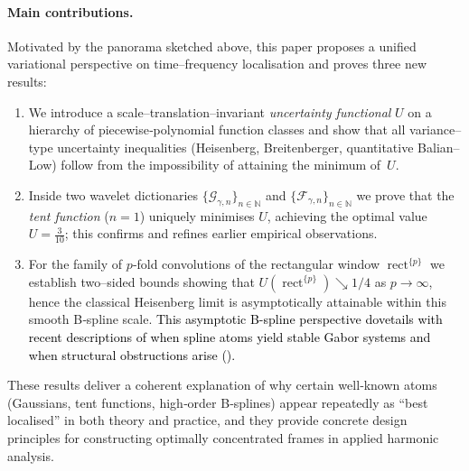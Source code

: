 \documentclass[preprint,hidelinks,authoryear]{elsarticle}
\theoremstyle{plain}
\theoremstyle{definition}
\theoremstyle{remark}
\begin{document}
\paragraph*{Main contributions.}
Motivated by the panorama sketched above, this paper proposes a unified
variational perspective on time–frequency localisation and proves three
new results:

\begin{enumerate}[label=\textbf{C\arabic*}.]
  \item We introduce a scale–translation–invariant \emph{uncertainty
        functional} $U$ on a hierarchy of piece\-wise‑polynomial
        function classes and show that all variance–type uncertainty
        inequalities (Heisenberg, Breitenberger, quantitative Balian–Low)
        follow from the impossibility of attaining the minimum of~$U$.
  \item Inside two wavelet dictionaries
        $\{\mathcal G_{\gamma,n}\}_{n\in\mathbb N}$ and
        $\{\mathcal F_{\gamma,n}\}_{n\in\mathbb N}$ we prove that the
        \emph{tent function} ($n=1$) uniquely minimises $U$, achieving the
        optimal value $U=\frac{3}{10}$; this confirms and refines earlier
        empirical observations.
  \item For the family of $p$‑fold convolutions of the rectangular
        window $\operatorname{rect}^{\{p\}}$ we establish two–sided
        bounds showing that $U(\operatorname{rect}^{\{p\}})\searrow
        1/4$ as $p\to\infty$, hence the classical Heisenberg limit is
        asymptotically attainable within this smooth B‑spline scale. \textcolor{black}{This asymptotic B-spline perspective dovetails with recent descriptions of when spline atoms yield stable Gabor systems and when structural obstructions arise (\cite{ghosh2025gabor,ghosh2025obstructions}).}
\end{enumerate}

These results deliver a coherent explanation of why certain well‑known
atoms (Gaussians, tent functions, high‑order B‑splines) appear
repeatedly as “best localised” in both theory and practice, and they
provide concrete design principles for constructing optimally
concentrated frames in applied harmonic analysis.
\end{document}

